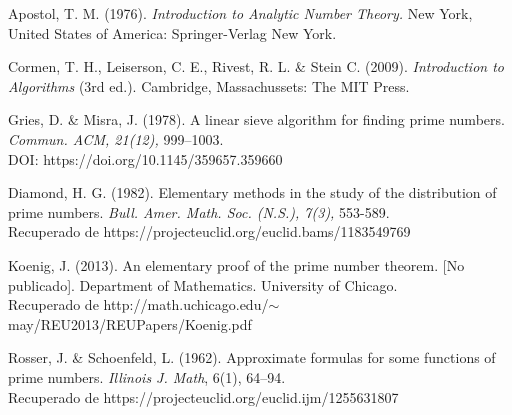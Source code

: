 \documentclass{article}
\theoremstyle{definition}
\theoremstyle{remark}
\begin{document}
\newpage

\begin{thebibliography}{6}
Apostol, T. M. (1976).
\textit{Introduction to Analytic Number Theory.}
New York, United States of America: Springer-Verlag New York.

Cormen, T. H., Leiserson, C. E., Rivest, R. L. \& Stein C. (2009).
\textit{Introduction to Algorithms} (3rd ed.).
Cambridge, Massachussets: The MIT Press.

Gries, D. \& Misra, J. (1978).
A linear sieve algorithm for finding prime numbers.
\textit{Commun. ACM, 21(12),} 999–1003.\\
DOI: https://doi.org/10.1145/359657.359660

Diamond, H. G. (1982).
Elementary methods in the study of the distribution of prime numbers. \textit{Bull. Amer. Math. Soc. (N.S.), 7(3),} 553-589.\\
Recuperado de https://projecteuclid.org/euclid.bams/1183549769

Koenig, J. (2013).
An elementary proof of the prime number theorem. [No publicado].
Department of Mathematics. University of Chicago.\\
Recuperado de http://math.uchicago.edu/$\sim$may/REU2013/REUPapers/Koenig.pdf

Rosser, J. \& Schoenfeld, L. (1962). Approximate formulas for some functions of prime numbers. \textit{Illinois J. Math}, 6(1), 64--94.\\
Recuperado de https://projecteuclid.org/euclid.ijm/1255631807
\end{thebibliography}
\end{document}
